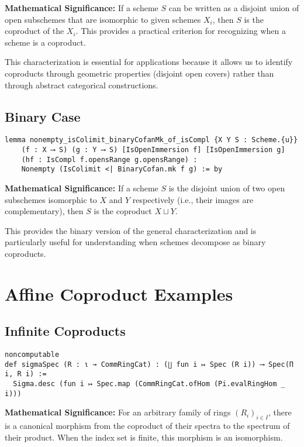\documentclass{article}
\theoremstyle{definition}
\begin{document}
\textbf{Mathematical Significance:} If a scheme $S$ can be written as a disjoint union of open subschemes that are isomorphic to given schemes $X_i$, then $S$ is the coproduct of the $X_i$. This provides a practical criterion for recognizing when a scheme is a coproduct.

This characterization is essential for applications because it allows us to identify coproducts through geometric properties (disjoint open covers) rather than through abstract categorical constructions.

\subsection{Binary Case}

\begin{lstlisting}
lemma nonempty_isColimit_binaryCofanMk_of_isCompl {X Y S : Scheme.{u}}
    (f : X ⟶ S) (g : Y ⟶ S) [IsOpenImmersion f] [IsOpenImmersion g]
    (hf : IsCompl f.opensRange g.opensRange) :
    Nonempty (IsColimit <| BinaryCofan.mk f g) := by
\end{lstlisting}

\textbf{Mathematical Significance:} If a scheme $S$ is the disjoint union of two open subschemes isomorphic to $X$ and $Y$ respectively (i.e., their images are complementary), then $S$ is the coproduct $X \sqcup Y$.

This provides the binary version of the general characterization and is particularly useful for understanding when schemes decompose as binary coproducts.

\section{Affine Coproduct Examples}

\subsection{Infinite Coproducts}

\begin{lstlisting}
noncomputable
def sigmaSpec (R : ι → CommRingCat) : (∐ fun i ↦ Spec (R i)) ⟶ Spec(Π i, R i) :=
  Sigma.desc (fun i ↦ Spec.map (CommRingCat.ofHom (Pi.evalRingHom _ i)))
\end{lstlisting}

\textbf{Mathematical Significance:} For an arbitrary family of rings $(R_i)_{i \in I}$, there is a canonical morphism from the coproduct of their spectra to the spectrum of their product. When the index set is finite, this morphism is an isomorphism.
\end{document}
